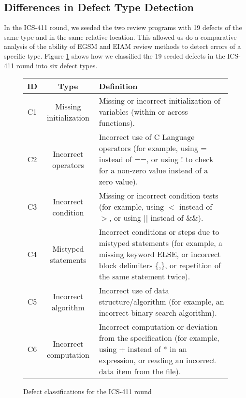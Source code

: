 \subsection{Differences in Defect Type Detection}

In the ICS-411 round, we seeded the two review programs with 19 defects of
the same type and in the same relative location.  This allowed us do a
comparative analysis of the ability of EGSM and EIAM review methods to
detect errors of a specific type.  Figure \ref{fig:defect-class} shows how
we classified the 19 seeded defects in the ICS-411 round into six defect
types.


\begin{figure}[t]
  \begin{center}
  \begin{tabular}{|c|c|p{3in}|}
   \hline
    ID & Type & Definition \\
   \hline
   C1 & Missing initialization &
        Missing or incorrect initialization of  variables
        (within or across functions).  \\
   C2 & Incorrect operators &
        Incorrect use of C Language operators (for example, using = 
        instead of ==, or using $!$ to check for a non-zero value instead
        of a zero value).\\
   C3 & Incorrect condition &
        Missing or incorrect condition tests (for example, using $<$
        instead of $>$, or using $||$ instead of \&\&).\\
   C4 & Mistyped statements &
        Incorrect conditions or  steps due to mistyped
        statements (for example, a missing keyword ELSE, or incorrect block
        delimiters \{,\}, or repetition of the same statement twice).\\
   C5 & Incorrect algorithm &
        Incorrect use of data structure/algorithm (for example,
        an incorrect binary search algorithm). \\
   C6 & Incorrect computation &
        Incorrect computation or deviation from the specification
        (for example, using + instead of * in an expression, or reading an incorrect
        data item from the file).\\
  \hline
   \end{tabular}
  \end{center}
 \label{fig:defect-class}
 \caption{Defect classifications for the ICS-411 round}
\end{figure}



